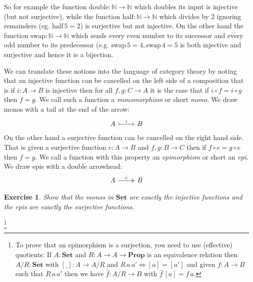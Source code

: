 \documentclass{article}
\newcommand{\Prop}{\mathbf{Prop}}
\newcommand{\Set}{\mathbf{Set}}
\newcommand{\cat}[1]{\underline{\mathbf{#1}}}
\newcommand{\Nat}{\mathbb{N}}
\newcommand{\half}{\mathrm{half}}
\newcommand{\double}{\mathrm{double}}
\newcommand{\swap}{\mathrm{swap}}
\newtheorem{exercise}{Exercise}
\begin{document}
So for example the function $\double : \Nat \to \Nat$ which doubles its input is injective (but not surjective), while the function $\half : \Nat \to \Nat$ which divides by 2 ignoring remainders (eg. $\half\,5 = 2$) is surjective but not injective. On the other hand the function $\swap : \Nat \to \Nat$ which sends every even number to its successor and every odd number to its predecessor (e.g. $\swap\,5 = 4, \swap\,4 = 5$ is both injective and surjective and hence it is a bijection.  

We can translate these notions into the language of category theory by noting that an injective function can be cancelled on the left side of a composition that is if $i : A \to B$ is injective then for all $f,g : C \to A$ it is the case  that if $i \circ f = i \circ g$ then $f = g$. We call such a function a \emph{monomorphism} or short \emph{mono}. We draw monos with a tail at the end of the arrow:
\[\begin{tikzcd}
A \arrow[r,rightarrowtail,"i"]  & B
\end{tikzcd} 
\]
On the other hand a surjective function can be cancelled on the right hand side. That is given a surjective function $e : A \to B$ and $f,g : B \to C$ then if $f \circ e = g \circ e$ then $f = g$. We call a function with this property an\emph{ epimorphism} or short an \emph{epi}. We draw epis with a double arrowhead:
\[\begin{tikzcd}
A \arrow[r,twoheadrightarrow,"e"]  & B
\end{tikzcd}
\]
\begin{exercise}
  Show that the monos in $\cat{Set}$ are exactly the injective functions and the epis are exactly the surjective functions.
\end{exercise}
\footnote{To prove that an epimorphism is a surjection, you need to use (effective) quotients: If $A:\Set$ and $R:A \to A \to \Prop$ is an equivalence relation then $A/R : \Set$ with $[\_] : A \to A/R$ and $R\,a\,a' \iff [a] = [a']$ and given $f : A \to B$ such that $R\,a\,a'$ then we have $\hat{f} : A/R \to B$ with $\hat{f}\,[a] = f\,a$. }
\end{document}
